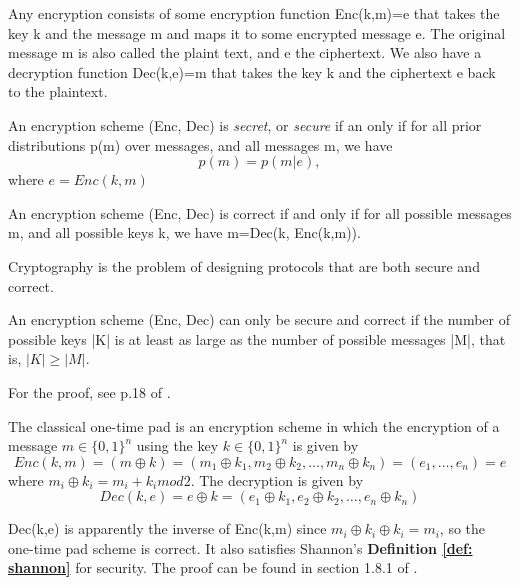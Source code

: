 
Any encryption consists of some encryption function Enc(k,m)=e that takes the key k and the message m and maps it to some encrypted message e. The original message m is also called the plaint text, and e the ciphertext. We also have a decryption function Dec(k,e)=m that takes the key k and the ciphertext e back to the plaintext. 
\begin{definition} \label{def: shannon}
An encryption scheme (Enc, Dec) is \textit{secret}, or \textit{secure} if an only if for all prior distributions p(m) over messages, and all messages m, we have
\begin{equation}
    p(m)=p(m|e),
\end{equation}
where $e=Enc(k,m)$
\end{definition}

\begin{definition}
An encryption scheme (Enc, Dec) is correct if and only if for all possible messages m, and all possible keys k, we have m=Dec(k, Enc(k,m)).
\end{definition}

Cryptography is the problem of designing protocols that are both secure and correct.
\begin{theorem}
An encryption scheme (Enc, Dec) can only be secure and correct if the number of possible keys |K| is at least as large as the number of possible messages |M|, that is, $|K| \ge |M|$.
\end{theorem}
For the proof, see p.18 of \cite{Wehner:notes}. 

\begin{definition}
The classical one-time pad is an encryption scheme in which the encryption of a message $m \in \{0, 1\}^n$ using the key $k \in \{0, 1\}^n$ is given by
\begin{equation}
    Enc(k,m)=(m \oplus k)=(m_1 \oplus k_1, m_2 \oplus k_2, \hdots, m_n \oplus k_n)=(e_1, \hdots, e_n)=e
\end{equation}
where $m_i \oplus k_i = m_i + k_i mod 2$. The decryption is given by
\begin{equation}
Dec(k, e)=e \oplus k = (e_1 \oplus k_1, e_2 \oplus k_2, \hdots, e_n \oplus k_n)
\end{equation}
\end{definition}
Dec(k,e) is apparently the inverse of Enc(k,m) since $m_i \oplus k_i \oplus k_i=m_i$, so the one-time pad scheme is correct. It also satisfies Shannon's \textbf{Definition \ref{def: shannon}} for security. The proof can be found in section 1.8.1 of \cite{Wehner:notes}.

